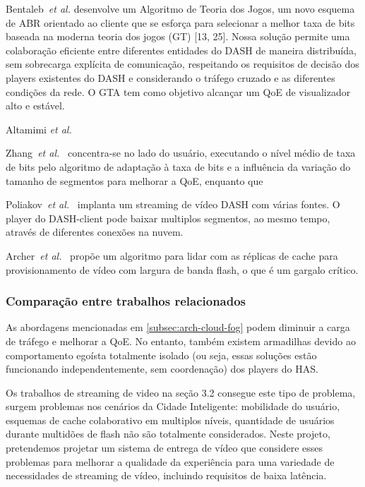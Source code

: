 Bentaleb~\textit{et al.} desenvolve um Algoritmo de Teoria dos Jogos, um novo esquema de ABR orientado ao cliente que se esforça para selecionar a melhor taxa de bits baseada na moderna teoria dos jogos (GT) [13, 25]. Nossa solução permite uma colaboração eficiente entre diferentes entidades do DASH de maneira distribuída, sem sobrecarga explícita de comunicação, respeitando os requisitos de decisão dos players existentes do DASH e considerando o tráfego cruzado e as diferentes condições da rede. O GTA tem como objetivo alcançar um QoE de visualizador alto e estável.


Altamimi \textit{et al.} 

Zhang~\textit{et al.}~\cite{zhangINFOCOM17} concentra-se no lado do usuário, executando o nível médio de taxa de bits pelo algoritmo de adaptação à taxa de bits e a influência da variação do tamanho de segmentos para melhorar a QoE, enquanto que 

Poliakov~\textit{et al.}~\cite{poliakovPHD2018} implanta um streaming de vídeo DASH com várias fontes. O player do DASH-client pode baixar multiplos segmentos, ao mesmo tempo, através de diferentes conexões na nuvem. 

Archer~\textit{et al.}~\cite{archerGoogleJournal2019} propõe um algoritmo para lidar com as réplicas de cache para provisionamento de vídeo com largura de banda flash, o que é um gargalo crítico.

\subsubsection{Comparação entre trabalhos relacionados}
\label{subsec:applications}

As abordagens mencionadas em \autoref{subsec:arch-cloud-fog} podem diminuir a carga de tráfego 
e melhorar a QoE. No entanto, também existem armadilhas devido ao comportamento egoísta totalmente isolado (ou seja, essas soluções estão funcionando independentemente, sem coordenação) dos players do HAS.

Os trabalhos de streaming de video na seção 3.2 consegue este tipo de problema, surgem problemas nos cenários da Cidade Inteligente: mobilidade do usuário, esquemas de cache colaborativo em multiplos níveis, quantidade de usuários durante multidões de flash não são totalmente considerados. Neste projeto, pretendemos projetar um sistema de entrega de vídeo que considere esses problemas para melhorar a qualidade da experiência para uma variedade de necessidades de streaming de vídeo, incluindo requisitos de baixa latência.


